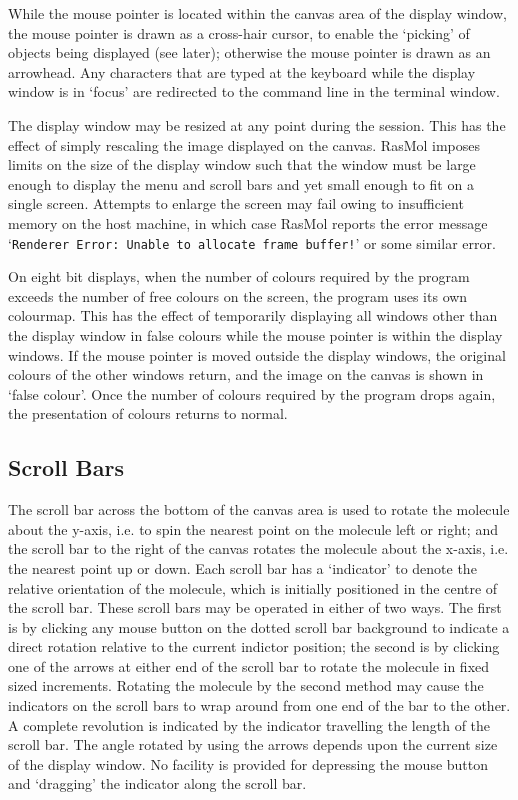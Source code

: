 While the mouse pointer is located within the canvas area of the display
window, the mouse pointer is drawn as a cross-hair cursor, to enable the
`picking' of objects being displayed (see later); otherwise the mouse pointer
is drawn as an arrowhead. Any characters that are typed at the keyboard
while the display window is in `focus' are redirected to the command line
in the terminal window.

The display window may be resized at any point during the session. This has
the effect of simply rescaling the image displayed on the canvas. RasMol
imposes limits on the size of the display window such that the window must
be large enough to display the menu and scroll bars and yet small enough to 
fit on a single screen. Attempts to enlarge the screen may fail owing to
insufficient memory on the host machine, in which case RasMol reports the
error message `{\tt Renderer Error: Unable to allocate frame buffer!}' or
some similar error.

On eight bit displays, when the number of colours required by the program
exceeds the number of free colours on the screen, the program uses its
own colourmap. This has the effect of temporarily displaying all windows
other than the display window in false colours while the mouse pointer is
within the display windows. If the mouse pointer is moved outside the
display windows, the original colours of the other windows return, and the
image on the canvas is shown in `false colour'. Once the number of colours
required by the program drops again, the presentation of colours returns
to normal.

\subsection{Scroll Bars}
\label{Scroll}
The scroll bar across the bottom of the canvas area is used to rotate the
molecule about the y-axis, i.e. to spin the nearest point on the molecule
left or right; and the scroll bar to the right of the canvas rotates the
molecule about the x-axis, i.e. the nearest point up or down. Each scroll
bar has a `indicator' to denote the relative orientation of the molecule,
which is initially positioned in the centre of the scroll bar. These scroll
bars may be operated in either of two ways. The first is by clicking any mouse
button on the dotted scroll bar background to indicate a direct rotation
relative to the current indictor position; the second is by clicking one of
the arrows at either end of the scroll bar to rotate the molecule in fixed
sized increments. Rotating the molecule by the second method may cause the
indicators on the scroll bars to wrap around from one end of the bar to the
other. A complete revolution is indicated by the indicator travelling the 
length of the scroll bar. The angle rotated by using the arrows depends
upon the current size of the display window. No facility is provided for
depressing the mouse button and `dragging' the indicator along the scroll 
bar.

